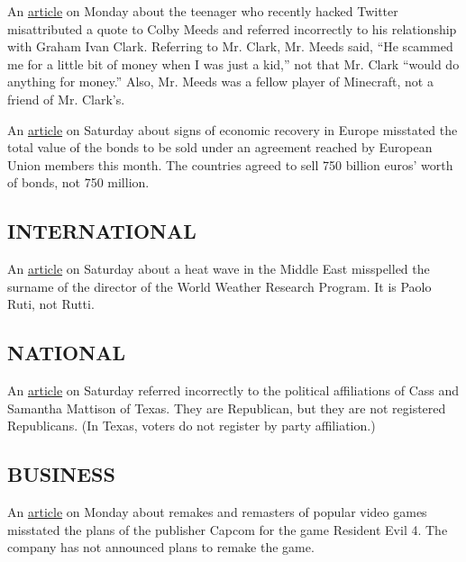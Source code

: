 An
\href{https://www.nytimes3xbfgragh.onion/2020/08/02/technology/florida-teenager-twitter-hack.html}{article}
on Monday about the teenager who recently hacked Twitter misattributed a
quote to Colby Meeds and referred incorrectly to his relationship with
Graham Ivan Clark. Referring to Mr. Clark, Mr. Meeds said, ``He scammed
me for a little bit of money when I was just a kid,'' not that Mr. Clark
``would do anything for money.'' Also, Mr. Meeds was a fellow player of
Minecraft, not a friend of Mr. Clark's.

An
\href{https://www.nytimes3xbfgragh.onion/2020/07/31/business/europe-economy-recovery-coronavirus.html}{article}
on Saturday about signs of economic recovery in Europe misstated the
total value of the bonds to be sold under an agreement reached by
European Union members this month. The countries agreed to sell 750
billion euros' worth of bonds, not 750 million.

\hypertarget{international}{%
\subsection{INTERNATIONAL}\label{international}}

An
\href{https://www.nytimes3xbfgragh.onion/2020/07/31/world/middleeast/Middle-East-heat-wave.html}{article}
on Saturday about a heat wave in the Middle East misspelled the surname
of the director of the World Weather Research Program. It is Paolo Ruti,
not Rutti.

\hypertarget{national}{%
\subsection{NATIONAL}\label{national}}

An
\href{https://www.nytimes3xbfgragh.onion/2020/08/01/us/politics/trump-suburban-voters-republicans-house.html}{article}
on Saturday referred incorrectly to the political affiliations of Cass
and Samantha Mattison of Texas. They are Republican, but they are not
registered Republicans. (In Texas, voters do not register by party
affiliation.)

\hypertarget{business}{%
\subsection{BUSINESS}\label{business}}

An
\href{https://www.nytimes3xbfgragh.onion/2020/08/01/business/video-game-remake-remaster-nostalgia.html}{article}
on Monday about remakes and remasters of popular video games misstated
the plans of the publisher Capcom for the game Resident Evil 4. The
company has not announced plans to remake the game.

